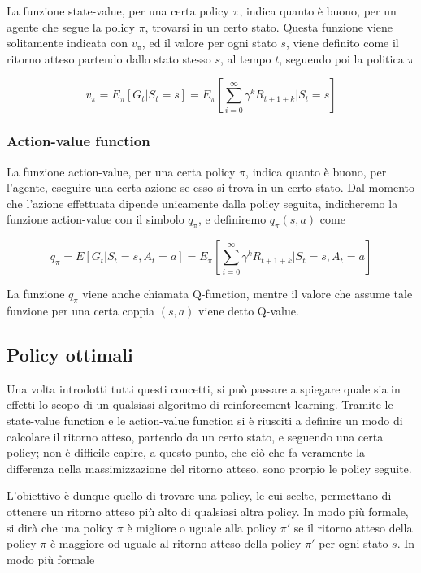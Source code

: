 \documentclass[a4paper,11pt,twoside]{report} %
\begin{document}
La funzione state-value, per una certa policy $\pi$, indica quanto è buono, per un agente che segue la policy $\pi$, trovarsi in un certo stato. Questa funzione viene solitamente indicata con $v_{\pi}$, ed il valore per ogni stato $s$, viene definito come il ritorno atteso partendo dallo stato stesso $s$, al tempo $t$, seguendo poi la politica $\pi$

\begin{equation}
	v_{\pi} = E_{\pi}[G_{t}|S_{t}=s]=E_{\pi}[\sum_{i=0}^{\infty}\gamma^{k}R_{t+1+k}|S_{t}=s]
\end{equation}
 
\subsubsection{Action-value function}

La funzione action-value, per una certa policy $\pi$, indica quanto è buono, per l'agente, eseguire una certa azione se esso si trova in un certo stato. Dal momento che l'azione effettuata dipende unicamente dalla policy seguita, indicheremo la funzione action-value con il simbolo $q_{\pi}$, e definiremo $q_{\pi}(s,a)$ come

\begin{equation}
q_{\pi} = E[G_{t}|S_{t}=s, A_{t}=a]=E_{\pi}[\sum_{i=0}^{\infty}\gamma^{k}R_{t+1+k}|S_{t}=s,A_{t}=a]
\end{equation}

La funzione $q_{\pi}$ viene anche chiamata Q-function, mentre il valore che assume tale funzione per una certa coppia $(s,a)$ viene detto Q-value.

\subsection{Policy ottimali}

Una volta introdotti tutti questi concetti, si può passare a spiegare quale sia in effetti lo scopo di un qualsiasi algoritmo di reinforcement learning. Tramite le state-value function e le action-value function si è riusciti a definire un modo di calcolare il ritorno atteso, partendo da un certo stato, e seguendo una certa policy; non è difficile capire, a questo punto, che ciò che fa veramente la differenza nella massimizzazione del ritorno atteso, sono prorpio le policy seguite. 

L'obiettivo è dunque quello di trovare una policy, le cui scelte, permettano di ottenere un ritorno atteso più alto di qualsiasi altra policy. In modo più formale, si dirà che una policy $\pi$ è migliore o uguale alla policy $\pi '$ se il ritorno atteso della policy $\pi$ è maggiore od uguale al ritorno atteso della policy $\pi '$ per ogni stato $s$. In modo più formale
\end{document}

